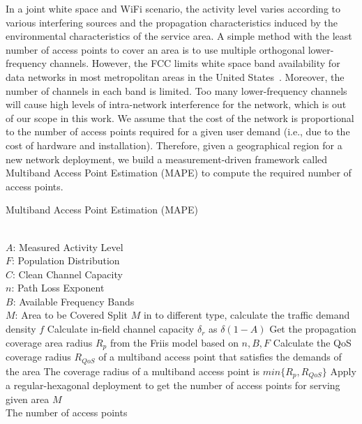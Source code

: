 In a joint white space and WiFi scenario, the activity level varies according to various interfering sources 
and the propagation characteristics induced by the environmental characteristics of the service area. A 
simple method with the least number of access points to cover an area is to use multiple orthogonal 
lower-frequency channels. However, the FCC limits white space band availability for data networks in most 
metropolitan areas in the United States~\cite{googledatabase}. Moreover, the number of channels in each band 
is limited. Too many lower-frequency channels will cause high levels of intra-network interference for the 
network, which is out of our scope in this work. We assume that the cost of the network is proportional to the 
number of access points required for a given user demand (i.e., due to the cost of hardware and installation). 
Therefore, given a geographical region for a new network deployment, we build a measurement-driven framework 
called Multiband Access Point Estimation (MAPE) to compute the required number of access points.

\begin{algorithm}[t]
\small
\caption{Multiband Access Point Estimation (MAPE)}
\label{algorithm:mape}
\begin{algorithmic}[1]
\REQUIRE  ~~\\
$A$: Measured Activity Level \\
$F$: Population Distribution\\
$C$: Clean Channel Capacity\\
$n$: Path Loss Exponent \\
$B$: Available Frequency Bands\\
$M$: Area to be Covered
\STATE Split $M$ in to different type, calculate the traffic demand density $f$
\STATE Calculate in-field channel capacity $\delta_r$ as $\delta(1-A)$
\STATE Get the propagation coverage area radius $R_p$ from the Friis model based on $n,B,F$
\STATE Calculate the QoS coverage radius $R_{QoS}$ of a multiband access point that satisfies the demands of the area
\STATE The coverage radius of a multiband access point is $min\{R_p,R_{QoS}\}$
\STATE Apply a regular-hexagonal deployment to get the number of access points for serving given area $M$
\ENSURE ~~\\
The number of access points\\
\end{algorithmic}
\end{algorithm}

